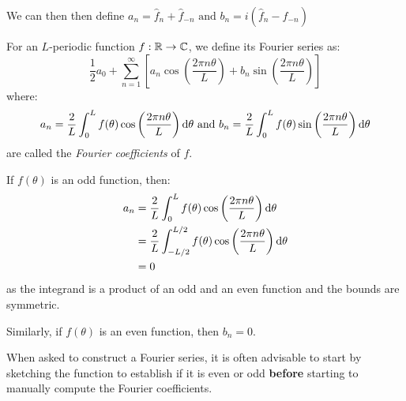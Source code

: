 \documentclass[../main.tex]{subfiles}
\begin{document}
We can then then define $a_{n} = \hat{f}_{n} + \hat{f}_{-n} \text{ and } b_n = i(\hat{f}_{n} - \hat{f}_{-n})$
\begin{definition}
  For an $L$-periodic function $f: \mathbb{R} \to \mathbb{C}$, we define its Fourier series as:
  \[
    \frac{1}{2} a_0 + \sum_{n = 1}^{\infty} \left[a_n \cos\left(\frac{2\pi n \theta}{L}\right) + b_n \sin \left(\frac{2 \pi n \theta}{L}\right)\right]
  \]
  where:
\[
  a_n = \frac{2}{L} \int_{0}^{L} f(\theta) \cos\left(\frac{2 \pi n \theta}{L}\right) \d{\theta} \text{ and }
  b_n = \frac{2}{L} \int_{0}^{L} f(\theta) \sin\left(\frac{2 \pi n \theta}{L}\right) \d{\theta}
\]
are called the \textit{Fourier coefficients} of $f$.
\end{definition}
\begin{remark}
  If $f(\theta)$ is an odd function, then:
  \begin{align*}
    a_n &= \frac{2}{L} \int_{0}^{L} f(\theta) \cos\left(\frac{2 \pi n \theta}{L}\right) \d{\theta} \\
        &= \frac{2}{L} \int_{-L/2}^{L/2} f(\theta) \cos\left(\frac{2 \pi n \theta}{L}\right) \d{\theta} \\
        &= 0
  \end{align*}
  as the integrand is a product of an odd and an even function and the bounds are symmetric.

  Similarly, if $f(\theta)$ is an even function, then $b_n = 0$.
\end{remark}
\begin{remark}[Advice]
  When asked to construct a Fourier series, it is often advisable to start by sketching the function to establish if it is even or odd \textbf{before} starting to manually compute the Fourier coefficients.
\end{remark}
\end{document}
